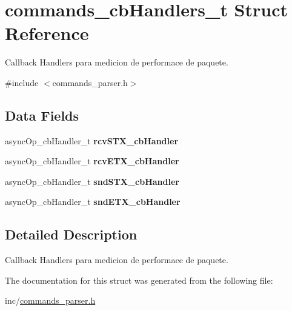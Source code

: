 \hypertarget{structcommands__cbHandlers__t}{}\section{commands\+\_\+cb\+Handlers\+\_\+t Struct Reference}
\label{structcommands__cbHandlers__t}


Callback Handlers para medicion de performace de paquete.  




{\ttfamily \#include $<$commands\+\_\+parser.\+h$>$}

\subsection*{Data Fields}
\begin{DoxyCompactItemize}
\item 
async\+Op\+\_\+cb\+Handler\+\_\+t {\bfseries rcv\+S\+T\+X\+\_\+cb\+Handler}\hypertarget{structcommands__cbHandlers__t_a06765df1bafbb207b39e9fcc42b694c5}{}\label{structcommands__cbHandlers__t_a06765df1bafbb207b39e9fcc42b694c5}

\item 
async\+Op\+\_\+cb\+Handler\+\_\+t {\bfseries rcv\+E\+T\+X\+\_\+cb\+Handler}\hypertarget{structcommands__cbHandlers__t_a91c44352924312a7064758fd6036e227}{}\label{structcommands__cbHandlers__t_a91c44352924312a7064758fd6036e227}

\item 
async\+Op\+\_\+cb\+Handler\+\_\+t {\bfseries snd\+S\+T\+X\+\_\+cb\+Handler}\hypertarget{structcommands__cbHandlers__t_a6fc7facea8a65e5bb923d09136c29bdf}{}\label{structcommands__cbHandlers__t_a6fc7facea8a65e5bb923d09136c29bdf}

\item 
async\+Op\+\_\+cb\+Handler\+\_\+t {\bfseries snd\+E\+T\+X\+\_\+cb\+Handler}\hypertarget{structcommands__cbHandlers__t_af420c8239bc8df06db90c7603ed1d5ec}{}\label{structcommands__cbHandlers__t_af420c8239bc8df06db90c7603ed1d5ec}

\end{DoxyCompactItemize}


\subsection{Detailed Description}
Callback Handlers para medicion de performace de paquete. 

The documentation for this struct was generated from the following file\+:\begin{DoxyCompactItemize}
\item 
inc/\hyperlink{commands__parser_8h}{commands\+\_\+parser.\+h}\end{DoxyCompactItemize}
